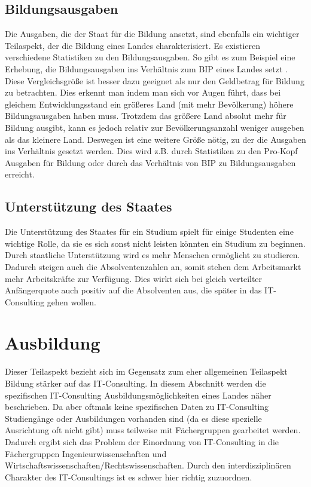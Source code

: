 \subsection{Bildungsausgaben}
Die Ausgaben, die der Staat für die Bildung ansetzt, sind ebenfalls ein wichtiger Teilaspekt, der die Bildung eines Landes charakterisiert.
Es existieren verschiedene Statistiken zu den Bildungsausgaben. So gibt es zum Beispiel eine Erhebung, die Bildungsausgaben ins Verhältnis zum BIP eines Landes setzt\cite[6]{oecd2} . Diese Vergleichsgröße ist besser dazu geeignet als nur den Geldbetrag für Bildung zu betrachten. Dies erkennt man indem man sich vor Augen führt, dass bei gleichem Entwicklungsstand ein größeres Land (mit mehr Bevölkerung) höhere Bildungsausgaben haben muss. Trotzdem das größere Land absolut mehr für Bildung ausgibt, kann es jedoch relativ zur Bevölkerungsanzahl weniger ausgeben als das kleinere Land. Deswegen ist eine weitere Größe nötig, zu der die Ausgaben ins Verhältnis gesetzt werden. Dies wird z.B. durch Statistiken zu den Pro-Kopf Ausgaben für Bildung \cite[4]{oecd2} oder durch das Verhältnis von BIP zu Bildungsausgaben erreicht.

\subsection{Unterstützung des Staates} 
Die Unterstützung des Staates für ein Studium spielt für einige Studenten eine wichtige Rolle, da sie es sich sonst nicht leisten könnten ein Studium zu beginnen. Durch staatliche Unterstützung wird es mehr Menschen ermöglicht zu studieren. Dadurch steigen auch die Absolventenzahlen an, somit stehen dem Arbeitsmarkt mehr Arbeitskräfte zur Verfügung. Dies wirkt sich bei gleich verteilter Anfängerquote auch positiv auf die Absolventen aus, die später in das IT-Consulting gehen wollen.

 \section{Ausbildung}
Dieser Teilaspekt bezieht sich im Gegensatz zum eher allgemeinen Teilaspekt Bildung stärker auf das IT-Consulting. In diesem Abschnitt werden die spezifischen IT-Consulting Ausbildungsmöglichkeiten eines Landes näher beschrieben.
Da aber oftmals keine spezifischen Daten zu IT-Consulting Studiengänge oder Ausbildungen vorhanden sind (da es diese spezielle Ausrichtung oft nicht gibt) muss teilweise mit Fächergruppen gearbeitet werden.
Dadurch ergibt sich das Problem der Einordnung von IT-Consulting in die Fächergruppen Ingenieurwissenschaften und Wirtschaftswissenschaften/Rechtswissenschaften. Durch den interdisziplinären Charakter des IT-Consultings ist es schwer hier richtig zuzuordnen.

